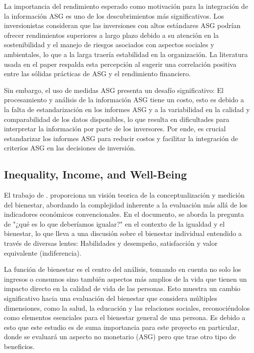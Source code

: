 La importancia del rendimiento esperado como motivación para la integración de la información ASG es uno de los descubrimientos más significativos. Los inversionistas consideran que las inversiones con altos estándares ASG podrían ofrecer rendimientos superiores a largo plazo debido a su atención en la sostenibilidad y el manejo de riesgos asociados con aspectos sociales y ambientales, lo que a la larga traería estabilidad en la organización. La literatura usada en el paper respalda esta percepción al sugerir una correlación positiva entre las sólidas prácticas de ASG y el rendimiento financiero.

Sin embargo, el uso de medidas ASG presenta un desafío significativo: El procesamiento y análisis de la información ASG tiene un costo, esto es debido a la falta de estandarización en los informes ASG y a la variabilidad en la calidad y comparabilidad de los datos disponibles, lo que resulta en dificultades para interpretar la información por parte de los inversores. Por ende, es crucial estandarizar los informes ASG para reducir costos y facilitar la integración de criterios ASG en las decisiones de inversión.

\subsection{Inequality, Income, and Well-Being}
El trabajo de . proporciona un visión teorica de la conceptualización y medición del bienestar, abordando la complejidad inherente a la evaluación más allá de los indicadores económicos convencionales. En el documento, se aborda la pregunta de "¿qué es lo que deberíamos igualar?" en el contexto de la igualdad y el bienestar, lo que lleva a una discusión sobre el bienestar individual entendido a través de diversas lentes: Habilidades y desempeño, satisfacción y valor equivalente (indiferencia).

La función de bienestar es el centro del análisis, tomando en cuenta no solo los ingresos o consumos sino también aspectos más amplios de la vida que tienen un impacto directo en la calidad de vida de las personas. Esto muestra un cambio significativo hacia una evaluación del bienestar que considera múltiples dimensiones, como la salud, la educación y las relaciones sociales, reconociéndolos como elementos esenciales para el bienestar general de una persona. Es debido a esto que este estudio es de suma importancia para este proyecto en particular, donde se evaluará un aspecto no monetario (ASG) pero que trae otro tipo de beneficios.

